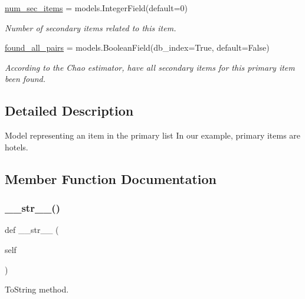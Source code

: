 \begin{DoxyCompactItemize}
\mbox{\hyperlink{classjoinapp_1_1models_1_1items_1_1_primary_item_a03d74f618037ba767c1bb9424b97dbf3}{num\+\_\+sec\+\_\+items}} = models.\+Integer\+Field(default=0)
\begin{DoxyCompactList}\small\item\em Number of secondary items related to this item. \end{DoxyCompactList}\item 
\mbox{\hyperlink{classjoinapp_1_1models_1_1items_1_1_primary_item_a1360f28af178672145c001e52ae799b3}{found\+\_\+all\+\_\+pairs}} = models.\+Boolean\+Field(db\+\_\+index=True, default=False)
\begin{DoxyCompactList}\small\item\em According to the Chao estimator, have all secondary items for this primary item been found. \end{DoxyCompactList}\end{DoxyCompactItemize}


\subsection{Detailed Description}
Model representing an item in the primary list In our example, primary items are hotels. 

\subsection{Member Function Documentation}
\mbox{\label{classjoinapp_1_1models_1_1items_1_1_primary_item_a23e8041ce1015febe4fdace3225714f9}} 
\subsubsection{\texorpdfstring{\_\_str\_\_()}{\_\_str\_\_()}}
{\footnotesize\ttfamily def \+\_\+\+\_\+str\+\_\+\+\_\+ (\begin{DoxyParamCaption}\item[{}]{self }\end{DoxyParamCaption})}



To\+String method. 

\mbox{\label{classjoinapp_1_1models_1_1items_1_1_primary_item_abb811d3b5d38292739bb5f35f664ccb7}} 
